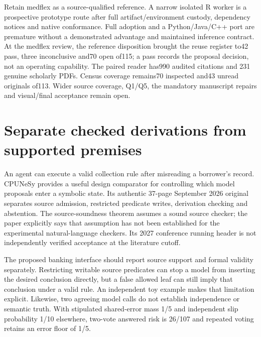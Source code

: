 Retain medflex as a source-qualified reference. A narrow isolated R
worker is a prospective prototype route after full artifact/environment
custody, dependency notices and native conformance. Full adoption and a
Python/Java/C++ port are premature without a demonstrated advantage and
maintained inference contract. At the medflex review, the reference
disposition brought the reuse register to42 pass, three inconclusive
and70 open of115; a pass records the proposal decision, not an operating
capability. The paired reader has990 audited citations and 231 genuine
scholarly PDFs. Census coverage remains70 inspected and43 unread
originals of113. Wider source coverage, Q1/Q5, the mandatory manuscript
repairs and visual/final acceptance remain open.
\citep{sp23medflex_reader,sp23medflex_progress}

\hypertarget{separate-checked-derivations-from-supported-premises}{%
\section{Separate checked derivations from supported
premises}\label{separate-checked-derivations-from-supported-premises}}

An agent can execute a valid collection rule after misreading a
borrower's record. CPUNeSy provides a useful design comparator for
controlling which model proposals enter a symbolic state. Its authentic
37-page September 2026 original separates source admission, restricted
predicate writes, derivation checking and abstention. The
source-soundness theorem assumes a sound source checker; the paper
explicitly says that assumption has not been established for the
experimental natural-language checkers. Its 2027 conference running
header is not independently verified acceptance at the literature
cutoff. \citep{exec23_controlled_writes_paper}

The proposed banking interface should report source support and formal
validity separately. Restricting writable source predicates can stop a
model from inserting the desired conclusion directly, but a false
allowed leaf can still imply that conclusion under a valid rule. An
independent toy example makes that limitation explicit. Likewise, two
agreeing model calls do not establish independence or semantic truth.
With stipulated shared-error mass 1/5 and independent slip probability
1/10 elsewhere, two-vote answered risk is 26/107 and repeated voting
retains an error floor of 1/5.
\citep{exec23_controlled_writes_paper,exec23_controlled_writes_reference}

